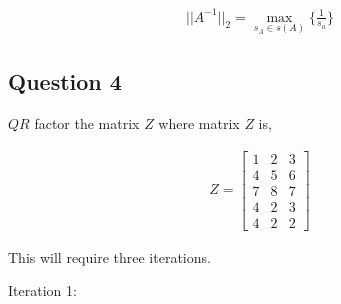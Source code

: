 \begin{eqnarray}
  ||A^{-1}||_2 = \max_{s_A \in s(A)} \{\frac{1}{s_a}\}
\end{eqnarray}




\newpage
\subsection{Question 4}

\(QR\) factor the matrix \(Z\) where matrix \(Z\) is,

\begin{eqnarray}
  Z = 
  \begin{bmatrix}
    1 & 2 & 3 \\
    4 & 5 & 6 \\
    7 & 8 & 7 \\
    4 & 2 & 3 \\
    4 & 2 & 2
  \end{bmatrix}
\end{eqnarray}
  
This will require three iterations.

Iteration 1:

